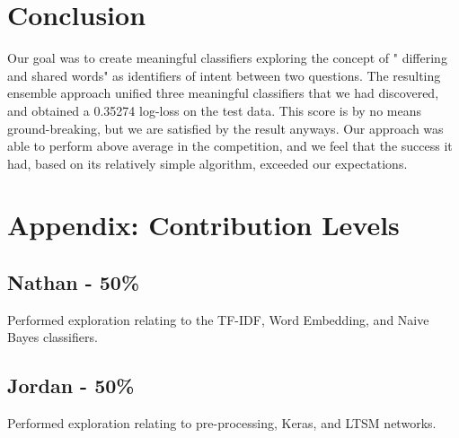\documentclass{article}
\begin{document}
\section{Conclusion} \label{headings} Our goal was to create meaningful
classifiers exploring the concept of " differing and shared words" as
identifiers of intent between two questions. The resulting ensemble approach
unified three meaningful classifiers that we had discovered, and obtained a
0.35274 log-loss on the test data. This score is by no means ground-breaking,
but we are satisfied by the result anyways. Our approach was able to perform
above average in the competition, and we feel that the success it had, based on
its relatively simple algorithm, exceeded our expectations.

\section*{Appendix: Contribution Levels}

\subsection*{Nathan - 50\%}
Performed exploration relating to the TF-IDF, Word Embedding, and Naive Bayes classifiers.

\subsection*{Jordan - 50\%}
Performed exploration relating to pre-processing, Keras, and LTSM networks.
\end{document}
